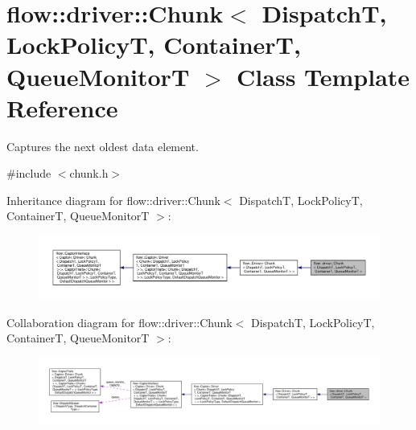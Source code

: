 \hypertarget{classflow_1_1driver_1_1_chunk}{}\section{flow\+:\+:driver\+:\+:Chunk$<$ DispatchT, Lock\+PolicyT, ContainerT, Queue\+MonitorT $>$ Class Template Reference}
\label{classflow_1_1driver_1_1_chunk}


Captures the next oldest data element.  




{\ttfamily \#include $<$chunk.\+h$>$}



Inheritance diagram for flow\+:\+:driver\+:\+:Chunk$<$ DispatchT, Lock\+PolicyT, ContainerT, Queue\+MonitorT $>$\+:
\nopagebreak
\begin{figure}[H]
\begin{center}
\leavevmode
\includegraphics[width=350pt]{classflow_1_1driver_1_1_chunk__inherit__graph}
\end{center}
\end{figure}


Collaboration diagram for flow\+:\+:driver\+:\+:Chunk$<$ DispatchT, Lock\+PolicyT, ContainerT, Queue\+MonitorT $>$\+:
\nopagebreak
\begin{figure}[H]
\begin{center}
\leavevmode
\includegraphics[width=350pt]{classflow_1_1driver_1_1_chunk__coll__graph}
\end{center}
\end{figure}
